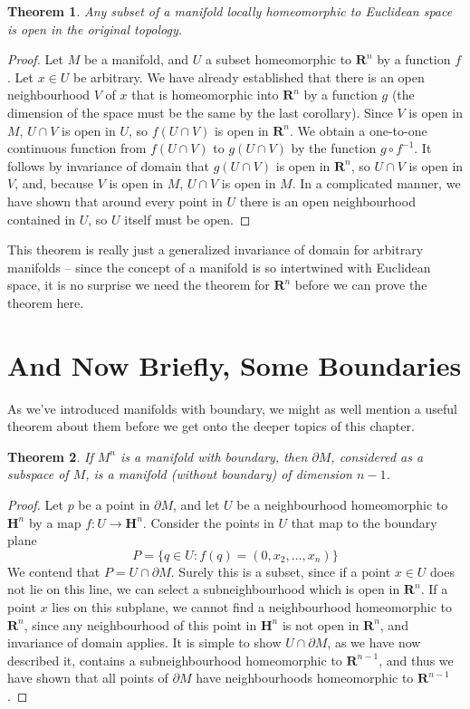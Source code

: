 \documentclass[12pt]{report}
\theoremstyle{plain}
\newtheorem{theorem}{Theorem}[chapter]
\theoremstyle{definition}
\begin{document}
\begin{theorem}
    Any subset of a manifold locally homeomorphic to Euclidean space is open in the original topology.
\end{theorem}
\begin{proof}
    Let $M$ be a manifold, and $U$ a subset homeomorphic to $\mathbf{R}^n$ by a function $f$. Let $x \in U$ be arbitrary. We have already established that there is an open neighbourhood $V$ of $x$ that is homeomorphic into $\mathbf{R}^n$ by a function $g$ (the dimension of the space must be the same by the last corollary). Since $V$ is open in $M$, $U \cap V$ is open in $U$, so $f(U \cap V)$ is open in $\mathbf{R}^n$. We obtain a one-to-one continuous function from $f(U \cap V)$ to $g(U \cap V)$ by the function $g \circ f^{-1}$. It follows by invariance of domain that $g(U \cap V)$ is open in $\mathbf{R}^n$, so $U \cap V$ is open in $V$, and, because $V$ is open in $M$, $U \cap V$ is open in $M$. In a complicated manner, we have shown that around every point in $U$ there is an open neighbourhood contained in $U$, so $U$ itself must be open.
\end{proof}

This theorem is really just a generalized invariance of domain for arbitrary manifolds -- since the concept of a manifold is so intertwined with Euclidean space, it is no surprise we need the theorem for $\mathbf{R}^n$ before we can prove the theorem here.

\section{And Now Briefly, Some Boundaries}

As we've introduced manifolds with boundary, we might as well mention a useful theorem about them before we get onto the deeper topics of this chapter.

\begin{theorem}
    If $M^n$ is a manifold with boundary, then $\partial M$, considered as a subspace of $M$, is a manifold (without boundary) of dimension $n-1$.
\end{theorem}
\begin{proof}
    Let $p$ be a point in $\partial M$, and let $U$ be a neighbourhood homeomorphic to $\mathbf{H}^n$ by a map $f:U \to \mathbf{H}^n$. Consider the points in $U$ that map to the boundary plane
    \[ P = \{ q \in U : f(q) = (0,x_2, \dots, x_n) \} \]
    We contend that $P = U \cap \partial M$. Surely this is a subset, since if a point $x \in U$ does not lie on this line, we can select a subneighbourhood which is open in $\mathbf{R}^n$. If a point $x$ lies on this subplane, we cannot find a neighbourhood homeomorphic to $\mathbf{R}^n$, since any neighbourhood of this point in $\mathbf{H}^n$ is not open in $\mathbf{R}^n$, and invariance of domain applies. It is simple to show $U \cap \partial M$, as we have now described it, contains a subneighbourhood homeomorphic to $\mathbf{R}^{n-1}$, and thus we have shown that all points of $\partial M$ have neighbourhoods homeomorphic to $\mathbf{R}^{n-1}$.
\end{proof}
\end{document}
